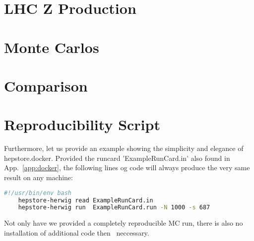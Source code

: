 
\section{LHC Z Production}
\section{Monte Carlos}
\section{Comparison}
\section{Reproducibility Script}

Furthermore, let us provide an example showing the simplicity and
elegance of hepstore.docker. Provided the runcard 'ExampleRunCard.in'
also found in App.~\ref{app:docker}, the following lines og code will
always produce the very same result on any machine:
%
\begin{changemargin}{1.5cm}{1.5cm} 
  \begin{lstlisting}[language=Bash]
    #!/usr/bin/env bash
    hepstore-herwig read ExampleRunCard.in
    hepstore-herwig run  ExampleRunCard.run -N 1000 -s 687\end{lstlisting}
\end{changemargin}
%
Not only have we provided a completely reproducible MC run, there is
also no installation of additional code then \hepstore~neccessary.
